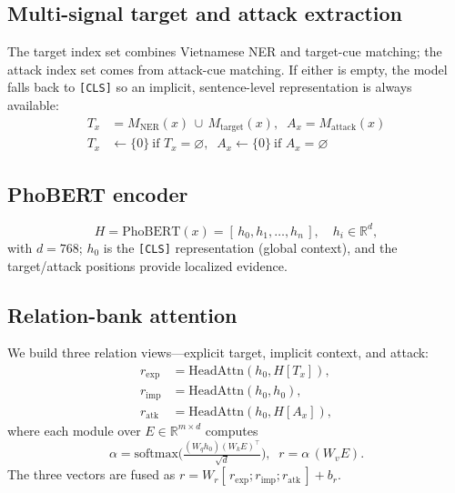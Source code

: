 \documentclass[11pt]{article}
\begin{document}
\subsection{Multi-signal target and attack extraction}
The target index set combines Vietnamese NER and target-cue matching; the attack index set comes from attack-cue matching. If either is empty, the model falls back to \texttt{[CLS]} so an implicit, sentence-level representation is always available:
\begin{align}
  T_x &= M_{\mathrm{NER}}(x)\,\cup\,M_{\mathrm{target}}(x), \;\; A_x = M_{\mathrm{attack}}(x) \\
  T_x &\leftarrow \{0\}\ \text{if } T_x=\varnothing, \;\; A_x \leftarrow \{0\}\ \text{if } A_x=\varnothing \nonumber
\end{align}

\subsection{PhoBERT encoder}
\begin{equation}
  H = \mathrm{PhoBERT}(x) = [\,h_0, h_1, \dots, h_n\,], \quad h_i \in \mathbb{R}^{d},
\end{equation}
with $d=768$; $h_0$ is the \texttt{[CLS]} representation (global context), and the target/attack positions provide localized evidence.

\subsection{Relation-bank attention}
We build three relation views---explicit target, implicit context, and attack:
\begin{align}
  r_{\mathrm{exp}} &= \mathrm{HeadAttn}(h_0, H[T_x]), \nonumber\\
  r_{\mathrm{imp}} &= \mathrm{HeadAttn}(h_0, h_0), \\
  r_{\mathrm{atk}} &= \mathrm{HeadAttn}(h_0, H[A_x]), \nonumber
\end{align}
where each module over $E \in \mathbb{R}^{m\times d}$ computes
\begin{equation}
  \alpha = \mathrm{softmax}\!\Big(\tfrac{(W_q h_0)(W_k E)^\top}{\sqrt d}\Big),\;\; r = \alpha\,(W_v E).
\end{equation}
The three vectors are fused as $r = W_r[\,r_{\mathrm{exp}};r_{\mathrm{imp}};r_{\mathrm{atk}}\,] + b_r$.
\end{document}
